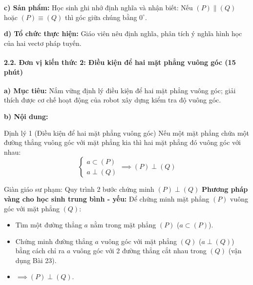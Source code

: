 \documentclass[12pt, a4paper]{article}
\begin{document}
\noindent \textbf{c) Sản phẩm:}
Học sinh ghi nhớ định nghĩa và nhận biết: Nếu $(P) \parallel (Q)$ hoặc $(P) \equiv (Q)$ thì góc giữa chúng bằng $0^\circ$.

\noindent \textbf{d) Tổ chức thực hiện:}
Giáo viên nêu định nghĩa, phân tích ý nghĩa hình học của hai vectơ pháp tuyến.

\paragraph{2.2. Đơn vị kiến thức 2: Điều kiện để hai mặt phẳng vuông góc (15 phút)}

\noindent \textbf{a) Mục tiêu:}
Nắm vững định lý điều kiện để hai mặt phẳng vuông góc; giải thích được cơ chế hoạt động của robot xây dựng kiểm tra độ vuông góc.

\noindent \textbf{b) Nội dung:}
\begin{pedabox}{Định lý 1 (Điều kiện để hai mặt phẳng vuông góc)}
Nếu một mặt phẳng chứa một đường thẳng vuông góc với mặt phẳng kia thì hai mặt phẳng đó vuông góc với nhau:
$$\begin{cases} a \subset (P) \\ a \perp (Q) \end{cases} \implies (P) \perp (Q)$$
\end{pedabox}

\begin{scaffoldbox}{Giàn giáo sư phạm: Quy trình 2 bước chứng minh $(P) \perp (Q)$}
\textbf{Phương pháp vàng cho học sinh trung bình - yếu:}
Để chứng minh mặt phẳng $(P)$ vuông góc với mặt phẳng $(Q)$:
\begin{itemize}
    \item[\textbf{Bước 1:}] Tìm một đường thẳng $a$ nằm trong mặt phẳng $(P)$ ($a \subset (P)$).
    \item[\textbf{Bước 2:}] Chứng minh đường thẳng $a$ vuông góc với mặt phẳng $(Q)$ ($a \perp (Q)$) bằng cách chỉ ra $a$ vuông góc với 2 đường thẳng cắt nhau trong $(Q)$ (vận dụng Bài 23).
    \item[\textbf{Kết luận:}] $\implies (P) \perp (Q)$.
\end{itemize}
\end{scaffoldbox}
\end{document}
